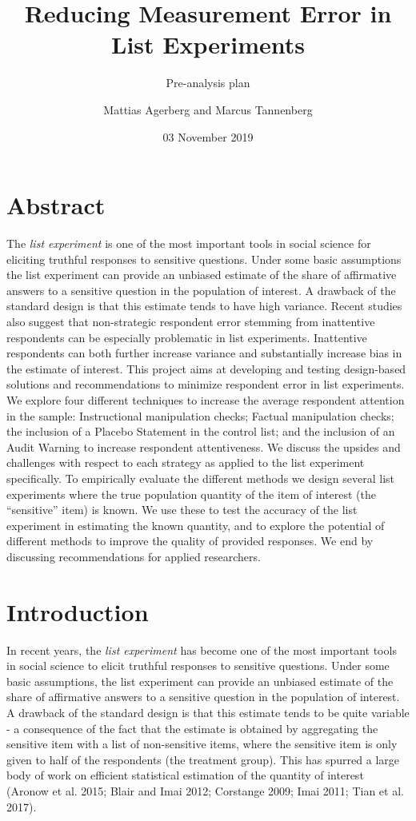 \documentclass[]{article}
\title{Reducing Measurement Error in List Experiments}
\subtitle{Pre-analysis plan}
\author{Mattias Agerberg and Marcus Tannenberg}
\date{03 November 2019}
\begin{document}
\maketitle

\hypertarget{abstract}{%
\section{Abstract}\label{abstract}}

The \emph{list experiment} is one of the most important tools in social
science for eliciting truthful responses to sensitive questions. Under
some basic assumptions the list experiment can provide an unbiased
estimate of the share of affirmative answers to a sensitive question in
the population of interest. A drawback of the standard design is that
this estimate tends to have high variance. Recent studies also suggest
that non-strategic respondent error stemming from inattentive
respondents can be especially problematic in list experiments.
Inattentive respondents can both further increase variance and
substantially increase bias in the estimate of interest. This project
aims at developing and testing design-based solutions and
recommendations to minimize respondent error in list experiments. We
explore four different techniques to increase the average respondent
attention in the sample: Instructional manipulation checks; Factual
manipulation checks; the inclusion of a Placebo Statement in the control
list; and the inclusion of an Audit Warning to increase respondent
attentiveness. We discuss the upsides and challenges with respect to
each strategy as applied to the list experiment specifically. To
empirically evaluate the different methods we design several list
experiments where the true population quantity of the item of interest
(the ``sensitive'' item) is known. We use these to test the accuracy of
the list experiment in estimating the known quantity, and to explore the
potential of different methods to improve the quality of provided
responses. We end by discussing recommendations for applied researchers.

\newpage

\hypertarget{introduction}{%
\section{Introduction}\label{introduction}}

In recent years, the \emph{list experiment} has become one of the most
important tools in social science to elicit truthful responses to
sensitive questions. Under some basic assumptions, the list experiment
can provide an unbiased estimate of the share of affirmative answers to
a sensitive question in the population of interest. A drawback of the
standard design is that this estimate tends to be quite variable - a
consequence of the fact that the estimate is obtained by aggregating the
sensitive item with a list of non-sensitive items, where the sensitive
item is only given to half of the respondents (the treatment group).
This has spurred a large body of work on efficient statistical
estimation of the quantity of interest (Aronow et al. 2015; Blair and
Imai 2012; Corstange 2009; Imai 2011; Tian et al. 2017).
\end{document}
